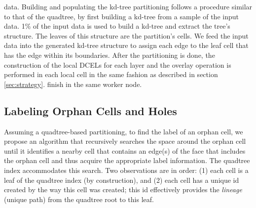 data. 
Building and populating the kd-tree partitioning follows a procedure similar to that of the quadtree, by first building a kd-tree from a sample of the input 
data.
1\% of the input data is used to build a kd-tree and extract the tree's structure. 
The leaves of this structure are the partition's cells. 
We feed the input data into the generated kd-tree structure to assign each edge to the leaf cell that has the edge within its boundaries.  
After the partitioning is done, the construction of the local DCELs for each layer and the overlay operation is performed in each local cell in the same fashion 
as described in section \ref{sec:strategy}. 
finish in the same worker node.  


\subsection{Labeling Orphan Cells and Holes} \label{sec:anomalies}




Assuming a quadtree-based partitioning, to find the label of an orphan cell, we propose an algorithm that recursively searches the space around the orphan cell 
until it identifies a nearby cell that contains an edge(s) of the face that includes the orphan cell and thus acquire the appropriate label information. The 
quadtree index accommodates this search. Two observations are in order: (1) each cell is a leaf of the quadtree index (by construction), and (2) each cell has a 
unique id created by the way this cell was created; this id effectively provides the \textit{lineage} (unique path) from the quadtree root to this leaf.

